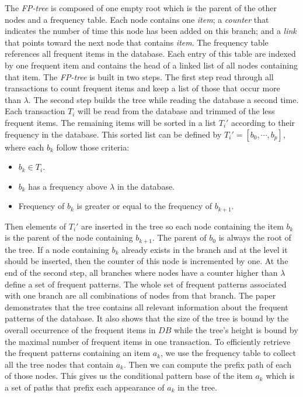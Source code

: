 \documentclass{article}
\begin{document}
The \textit{FP-tree} is composed of one empty root which is the parent of the other nodes and a frequency table.
Each node contains one \textit{item}; a \textit{counter} that indicates the number of time this node has been added on this branch;
and a \textit{link} that points toward the next node that contains \textit{item}.
The frequency table references all frequent items in the database.
Each entry of this table are indexed by one frequent item and contains the head of a linked list of all nodes containing that item.
The \textit{FP-tree} is built in two steps.
The first step read through all transactions to count frequent items and keep a list of those that occur more than $\lambda$.
The second step builds the tree while reading the database a second time.
Each transaction $T_i$ will be read from the database and trimmed of the less frequent items.
The remaining items will be sorted in a list $T_i'$ according to their frequency in the database.
This sorted list can be defined by $T_i' = [b_0, \cdots, b_p]$, where each $b_k$ follow those criteria:
\begin{itemize}
	\item $b_k \in T_i$.
	\item $b_k$ has a frequency above $\lambda$ in the database.
	\item Frequency of $b_k$ is greater or equal to the frequency of $b_{k+1}$.
\end{itemize}
Then elements of $T_i'$ are inserted in the tree so each node containing the item $b_k$ is the parent of the node containing $b_{k+1}$.
The parent of $b_0$ is always the root of the tree.
If a node containing $b_k$ already exists in the branch and at the level it should be inserted, then the counter of this node is incremented by one. 
At the end of the second step, all branches where nodes have a counter higher than $\lambda$ define a set of frequent patterns.
The whole set of frequent patterns associated with one branch are all combinations of nodes from that branch.
The paper demonstrates that the tree contains all relevant information about the frequent patterns of the database.
It also shows that the size of the tree is bound by the overall occurrence of the frequent items in $DB$ while the
tree's height is bound by the maximal number of frequent items in one transaction.
To efficiently retrieve the frequent patterns containing an item $a_k$, we use the frequency table to collect all the tree nodes that contain $a_k$.
Then we can compute the prefix path of each of those nodes.
This gives us the conditional pattern base of the item $a_k$ which is a set of paths that prefix each appearance of $a_k$ in the tree.
\end{document}
